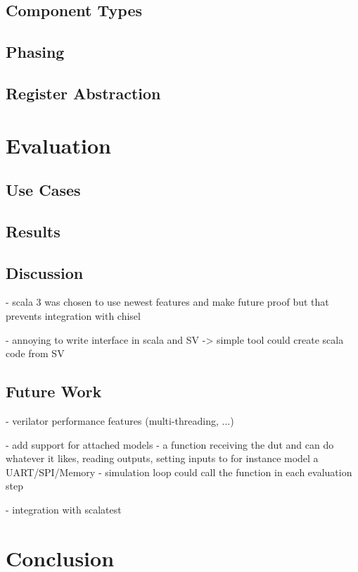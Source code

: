 \documentclass[12pt]{book}
\begin{document}
\section{Component Types}

\section{Phasing}

\section{Register Abstraction}


\chapter{Evaluation} %

\section{Use Cases} %

\section{Results} %

\section{Discussion} %

- scala 3 was chosen to use newest features and make future proof but that prevents integration with chisel

- annoying to write interface in scala and SV -> simple tool could create scala code from SV

\section{Future Work} %

- verilator performance features (multi-threading, ...)

- add support for attached models
  - a function receiving the dut and can do whatever it likes, reading outputs, setting inputs to for instance model a UART/SPI/Memory
  - simulation loop could call the function in each evaluation step

- integration with scalatest

\chapter{Conclusion} %

\printbibliography
\end{document}
